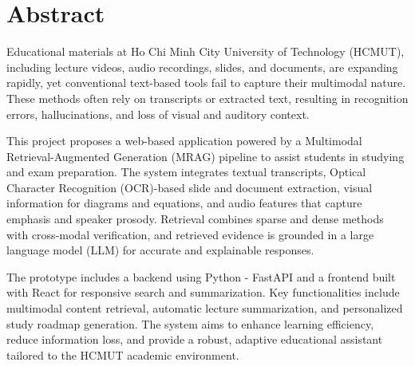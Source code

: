 \chapter*{Abstract}

Educational materials at Ho Chi Minh City University of Technology (HCMUT), including lecture videos, audio recordings, slides, and documents, are expanding rapidly, yet conventional text-based tools fail to capture their multimodal nature. These methods often rely on transcripts or extracted text, resulting in recognition errors, hallucinations, and loss of visual and auditory context.

This project proposes a web-based application powered by a Multimodal Retrieval-Augmented Generation (MRAG) pipeline to assist students in studying and exam preparation. The system integrates textual transcripts, Optical Character Recognition (OCR)-based slide and document extraction, visual information for diagrams and equations, and audio features that capture emphasis and speaker prosody. Retrieval combines sparse and dense methods with cross-modal verification, and retrieved evidence is grounded in a large language model (LLM) for accurate and explainable responses.

The prototype includes a backend using Python - FastAPI and a frontend built with React for responsive search and summarization. Key functionalities include multimodal content retrieval, automatic lecture summarization, and personalized study roadmap generation. The system aims to enhance learning efficiency, reduce information loss, and provide a robust, adaptive educational assistant tailored to the HCMUT academic environment.

\newpage

